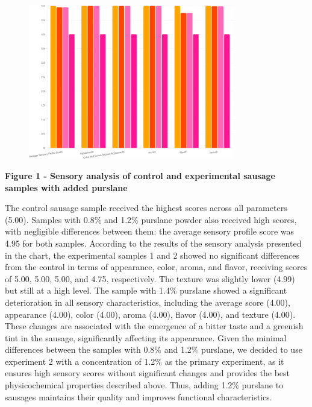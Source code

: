 \begin{figure}[H]
	\centering
	\includegraphics[width=0.8\textwidth]{assets/306}
	\caption*{}
\end{figure}

{\bfseries Figure 1 - Sensory analysis of control and experimental sausage
samples with added purslane}

The control sausage sample received the highest scores across all
parameters (5.00). Samples with 0.8\% and 1.2\% purslane powder also
received high scores, with negligible differences between them: the
average sensory profile score was 4.95 for both samples. According to
the results of the sensory analysis presented in the chart, the
experimental samples 1 and 2 showed no significant differences from the
control in terms of appearance, color, aroma, and flavor, receiving
scores of 5.00, 5.00, 5.00, and 4.75, respectively. The texture was
slightly lower (4.99) but still at a high level. The sample with 1.4\%
purslane showed a significant deterioration in all sensory
characteristics, including the average score (4.00), appearance (4.00),
color (4.00), aroma (4.00), flavor (4.00), and texture (4.00). These
changes are associated with the emergence of a bitter taste and a
greenish tint in the sausage, significantly affecting its appearance.
Given the minimal differences between the samples with 0.8\% and 1.2\%
purslane, we decided to use experiment 2 with a concentration of 1.2\%
as the primary experiment, as it ensures high sensory scores without
significant changes and provides the best physicochemical properties
described above. Thus, adding 1.2\% purslane to sausages maintains their
quality and improves functional characteristics.

